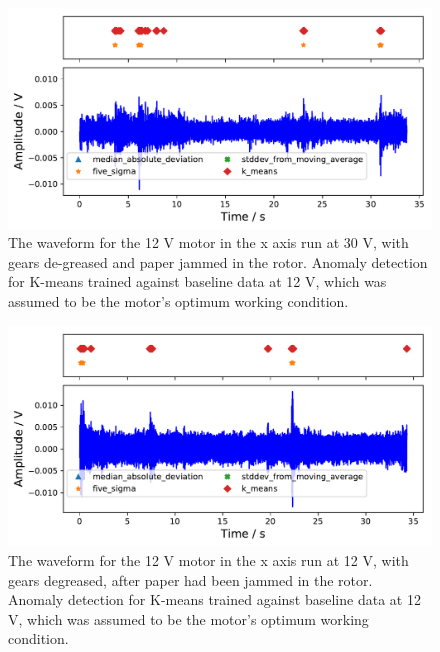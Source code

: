 \begin{figure}[t]
    \includegraphics[width=1.0\textwidth]{fig/WD40_dry_dirt_12V_motornorm12V.pdf}
    \caption[Anomaly Tests 30 V Motor with Paper Jam]{The waveform for the 12 V motor in the x axis run at 30 V, with gears de-greased and paper jammed in the rotor. Anomaly detection for K-means trained against baseline data at 12 V, which was assumed to be the motor's optimum working condition.}
    \label{fig:12V_paper}
\end{figure}

\begin{figure}[t]
    \includegraphics[width=1.0\textwidth]{fig/WD40_after_paper_12V_motornorm12V.pdf}
    \caption[Anomaly Tests 12 V Motor after Paper Jam]{The waveform for the 12 V motor in the x axis run at 12 V, with gears degreased, after paper had been jammed in the rotor. Anomaly detection for K-means trained against baseline data at 12 V, which was assumed to be the motor's optimum working condition.}
    \label{fig:12V_afterpaper}
\end{figure}


